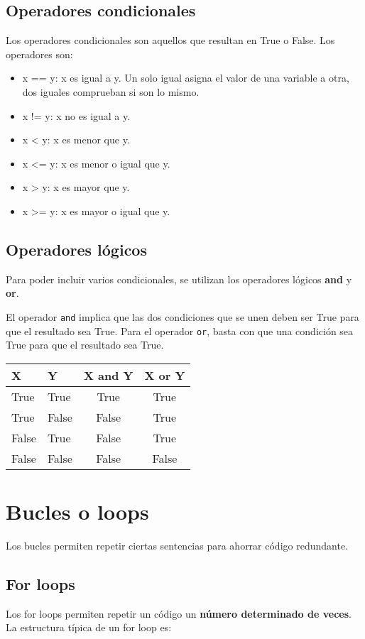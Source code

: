 \subsection{Operadores condicionales}
Los operadores condicionales son aquellos que resultan en True o False. Los operadores son:
\begin{itemize}
\item x == y: x es igual a y. Un solo igual asigna el valor de una variable a otra, dos iguales comprueban si son lo mismo.
\item x != y: x no es igual a y.
\item x < y: x es menor que y.
\item x <= y: x es menor o igual que y.
\item x > y: x es mayor que y.
\item x >= y: x es mayor o igual que y. 
\end{itemize}

\subsection{Operadores lógicos}
Para poder incluir varios condicionales, se utilizan los operadores lógicos \textbf{and} y \textbf{or}. 

El operador \texttt{and} implica que las dos condiciones que se unen deben ser True para que el resultado sea True. Para el operador \texttt{or}, basta con que una condición sea True para que el resultado sea True.

\begin{table}[htbp]
	\centering
	\begin{tabularx}{0.5\textwidth}{XXcc}
	X & Y & X and Y & X or Y \\ \hline
	True & True & True & True \\
	True & False & False & True \\
	False & True & False & True \\
	False & False & False & False
	\end{tabularx}
\end{table}

\section{Bucles o loops}
Los bucles permiten repetir ciertas sentencias para ahorrar código redundante. 

\subsection{For loops}
Los for loops permiten repetir un código un \textbf{número determinado de veces}. La estructura típica de un for loop es:

